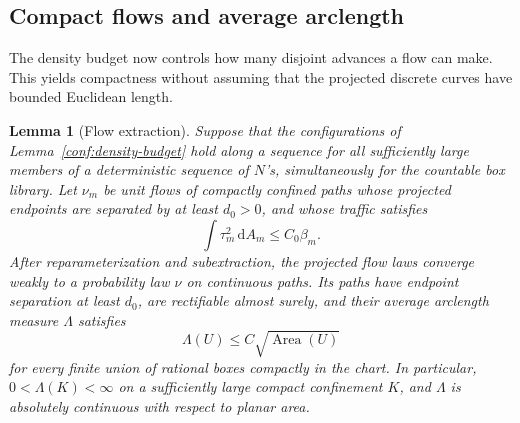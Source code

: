 \documentclass[11pt]{article}
\numberwithin{equation}{section}
\newtheorem{lemma}[theorem]{Lemma}
\theoremstyle{definition}
\theoremstyle{remark}
\newcommand{\1}{\mathbf 1}
\begin{document}
\subsection{Compact flows and average arclength}
\label{conf:flows}

The density budget now controls how many disjoint advances a flow can
make.  This yields compactness without assuming that the projected
discrete curves have bounded Euclidean length.

\begin{lemma}[Flow extraction]
\label{conf:flow-compactness}
Suppose that the configurations of Lemma~\ref{conf:density-budget}
hold along a sequence for all sufficiently large members of a
deterministic sequence of \(N\)'s, simultaneously for the countable
box library.  Let \(\nu_m\) be unit flows of compactly confined paths
whose projected endpoints are separated by at least \(d_0>0\), and
whose traffic satisfies
\[
 \int\tau_m^2\,\mathrm d A_m\le C_0\beta_m.
\]
After reparameterization and subextraction, the projected flow laws
converge weakly to a probability law \(\nu\) on continuous paths.
Its paths have endpoint separation at least \(d_0\), are rectifiable
almost surely, and their average arclength measure \(\Lambda\)
satisfies
\begin{equation}
 \Lambda(U)\le C\sqrt{\operatorname{Area}(U)}
 \label{conf:average-length}
\end{equation}
for every finite union of rational boxes compactly in the chart.
In particular, \(0<\Lambda(K)<\infty\) on a sufficiently large compact
confinement \(K\), and \(\Lambda\) is absolutely continuous with
respect to planar area.
\end{lemma}
\end{document}
